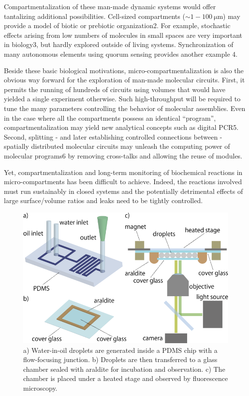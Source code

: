 \documentclass[prl,reprint, amsmath,amssymb,superscriptaddress]{revtex4-1}
\begin{document}
	Compartmentalization of these man-made dynamic systems would offer tantalizing additional possibilities. Cell-sized compartments ($\sim 1-\SI{100}{\micro\metre}$) may provide a model of biotic or prebiotic organization2. For example, stochastic effects arising from low numbers of molecules in small spaces are very important in biology3, but hardly explored outside of living systems. Synchronization of many autonomous elements using quorum sensing provides another example 4. 
	
	Beside these basic biological motivations, micro-compartmentalization is also the obvious way forward for the exploration of man-made molecular circuits. First, it permits the running of hundreds of circuits using volumes that would have yielded a single experiment otherwise. Such high-throughput will be required to tune the many parameters controlling the behavior of molecular assemblies. Even in the case where all the compartments possess an identical ``program'', compartmentalization may yield new analytical concepts such as digital PCR5. Second, splitting - and later establishing controlled connections between - spatially distributed molecular circuits may unleash the computing power of molecular programs6 by removing cross-talks and allowing the reuse of modules.
	
 	Yet, compartmentalization and long-term monitoring of biochemical reactions in micro-compartments has been difficult to achieve. Indeed, the reactions involved must run sustainably in closed systems and the potentially detrimental effects of large surface/volume ratios and leaks need to be tightly controlled.
 	
\begin{figure}
\includegraphics{setup}
\caption{a) Water-in-oil droplets are generated inside a PDMS chip with a flow-focusing junction. b) Droplets are then transferred to a glass chamber sealed with araldite for incubation and observation. c) The chamber is placed under a heated stage and observed by fluorescence microscopy.}
\label{fig:setup}
\end{figure}
 	
\end{document}
